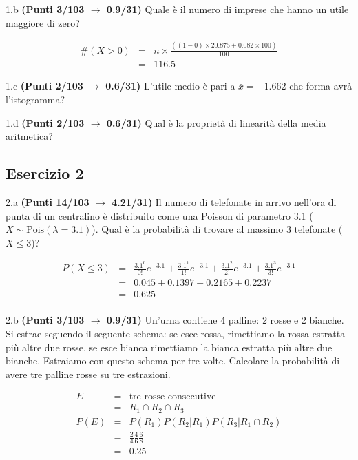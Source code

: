 \documentclass[
  11pt,
]{book}
\theoremstyle{mytheoremstyle}
\theoremstyle{mydefstyle}
\newenvironment{sol}
  {
  \begin{tcolorbox}[enhanced,breakable,arc=0.1mm,boxrule=1pt,colback=white,colframe=iblue,
  title=\bf \fontfamily{lmss}\selectfont \hspace{.5 cm} Soluzione,drop fuzzy shadow]

}{
\end{tcolorbox}
  }
\begin{document}
1.b \textbf{(Punti 3/103 \(\rightarrow\) 0.9/31)} Quale è il numero di imprese che hanno un utile maggiore di zero?

\begin{sol}
\begin{eqnarray*}
  \#(X>0) &=& n\times \frac{((1-0)\times 20.875+0.082\times 100)}{100}\\
   &=& 116.5
\end{eqnarray*}

\end{sol}

1.c \textbf{(Punti 2/103 \(\rightarrow\) 0.6/31)} L'utile medio è pari a \(\bar x=-1.662\) che forma avrà l'istogramma?

1.d \textbf{(Punti 2/103 \(\rightarrow\) 0.6/31)} Qual è la proprietà di linearità della media aritmetica?

\subsection{Esercizio 2}\label{esercizio-2-23}

2.a \textbf{(Punti 14/103 \(\rightarrow\) 4.21/31)} Il numero di telefonate in arrivo nell'ora di punta di un centralino è distribuito come una Poisson di parametro 3.1 (\(X\sim\text{Pois}(\lambda=3.1)\)). Qual è la probabilità di trovare al massimo 3 telefonate (\(X\le 3\))?

\begin{sol}
\begin{eqnarray*}
  P(X\le 3) &=&  \frac{3.1^0}{0!}e^{-3.1}+\frac{3.1^1}{1!}e^{-3.1}+\frac{3.1^2}{2!}e^{-3.1}+\frac{3.1^3}{3!}e^{-3.1}\\
  &=& 0.045+0.1397+0.2165+0.2237\\
  &=& 0.625\\
\end{eqnarray*}

\end{sol}

2.b \textbf{(Punti 3/103 \(\rightarrow\) 0.9/31)} Un'urna contiene 4 palline: 2 rosse e 2 bianche. Si estrae seguendo il seguente schema: se esce rossa, rimettiamo la rossa estratta più altre due rosse, se esce bianca rimettiamo la bianca estratta più altre due bianche. Estraiamo con questo schema per tre volte. Calcolare la probabilità di avere tre palline rosse su tre estrazioni.

\begin{sol}
\begin{eqnarray*}
  E &=&  \text{tre rosse consecutive}\\
  &=& R_1\cap R_2 \cap R_3\\
P(E)  &=& P(R_1)P( R_2|R_1) P( R_3|R_1\cap R_2)\\
&=& \frac 24 \frac 46 \frac 68\\
&=& 0.25
\end{eqnarray*}

\end{sol}
\end{document}
